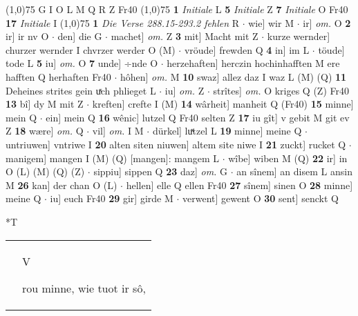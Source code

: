\documentclass[8pt,a4paper,notitlepage]{article}
\begin{document}
\begin{table}[ht]
\begin{minipage}[t]{0.5\linewidth}
\begin{tabular}{rl}
\end{tabular}
\scriptsize
\line(1,0){75} \newline
G I O L M Q R Z Fr40 \newline
\line(1,0){75} \newline
\textbf{1} \textit{Initiale} L  \textbf{5} \textit{Initiale} Z  \textbf{7} \textit{Initiale} O Fr40  \textbf{17} \textit{Initiale} I  \newline
\line(1,0){75} \newline
\textbf{1} \textit{Die Verse 288.15-293.2 fehlen} R   $\cdot$ wie] wir M  $\cdot$ ir] \textit{om.} O \textbf{2} ir] ir nv O  $\cdot$ den] die G  $\cdot$ machet] \textit{om.} Z \textbf{3} mit] Macht mit Z  $\cdot$ kurze wernder] churzer wernder I chvrzer werder O (M)  $\cdot$ vröude] frewden Q \textbf{4} in] im L  $\cdot$ töude] tode L \textbf{5} iu] \textit{om.} O \textbf{7} unde] ÷nde O  $\cdot$ herzehaften] herczin hochinhafften M ere hafften Q herhaften Fr40  $\cdot$ hôhen] \textit{om.} M \textbf{10} swaz] allez daz I waz L (M) (Q) \textbf{11} Deheines strites gein uͯch phlieget L  $\cdot$ iu] \textit{om.} Z  $\cdot$ strîtes] \textit{om.} O kriges Q (Z) Fr40 \textbf{13} bî] dy M mit Z  $\cdot$ kreften] crefte I (M) \textbf{14} wârheit] manheit Q (Fr40) \textbf{15} minne] mein Q  $\cdot$ ein] mein Q \textbf{16} wênic] lutzel Q Fr40 selten Z \textbf{17} iu gît] v gebit M git ev Z \textbf{18} wære] \textit{om.} Q  $\cdot$ vil] \textit{om.} I M  $\cdot$ dürkel] luͯtzel L \textbf{19} minne] meine Q  $\cdot$ untriuwen] vntriwe I \textbf{20} alten siten niuwen] altem site niwe I \textbf{21} zuckt] rucket Q  $\cdot$ manigem] mangen I (M) (Q) [mangen]: mangem  L  $\cdot$ wîbe] wiben M (Q) \textbf{22} ir] in O (L) (M) (Q) (Z)  $\cdot$ sippiu] sippen Q \textbf{23} daz] \textit{om.} G  $\cdot$ an sînem] an disem L ansin M \textbf{26} kan] der chan O (L)  $\cdot$ hellen] elle Q ellen Fr40 \textbf{27} sînem] sinen O \textbf{28} minne] meine Q  $\cdot$ iu] euch Fr40 \textbf{29} gir] girde M  $\cdot$ verwent] gewent O \textbf{30} sent] senckt Q \newline
\end{minipage}
\hspace{0.5cm}
\begin{minipage}[t]{0.5\linewidth}
\small
\begin{center}*T
\end{center}
\begin{tabular}{rl}
 & \begin{large}V\end{large}rou minne, wie tuot ir sô,\\ 

\end{tabular}
\end{minipage}
\end{table}
\end{document}
